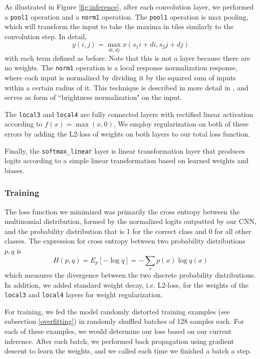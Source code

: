 \documentclass[11pt, twocolumn, twoside]{article}
\begin{document}
As illustrated in Figure \ref{fig:inference}, after each convolution layer, we performed a \texttt{pool1} operation and a \texttt{norm1} operation. The \texttt{pool1} operation is max pooling, which will transform the input to take the maxima in tiles similarly to the convolution step. In detail,
\[ y(i, j) = \max_{di, dj} x(s_1i + di, s_2j + dj)\]
with each term defined as before. Note that this is not a layer because there are no weights. The \texttt{norm1} operation is a local response normalization response, where each input is normalized by dividing it by the squared sum of inputs within a certain radius of it. This technique is described in more detail in \cite{Krizhevsky}, and serves as form of ``brightness normalization" on the input.

The \texttt{local3} and \texttt{local4} are fully connected layers with rectified linear activation according to $f(x) = \max(x, 0)$. We employ regularization on both of these errors by adding the L2-loss of weights on both layers to our total loss function. 

Finally, the \texttt{softmax\_linear} layer is linear transformation layer that produces logits according to a simple linear transformation based on learned weights and biases.

\subsubsection{Training}

The loss function we minimized was primarily the cross entropy between the multinomial distribution, formed by the normalized logits outputted by our CNN, and the probability distribution that is 1 for the correct class and 0 for all other classes. The expression for cross entropy between two probability distributions $p, q$ is
\[H(p, q) = E_p[-\log q] = -\sum_x p(x)\log q(x)\]
which measures the divergence between the two discrete probability distributions. In addition, we added standard weight decay, i.e. L2-loss, for the weights of the \texttt{local3} and \texttt{local4} layers for weight regularization.

For training, we fed the model randomly distorted training examples (see subsection \ref{overfitting}) in randomly shuffled batches of 128 samples each. For each of these examples, we would determine our loss based on our current inference. After each batch, we performed back propagation using gradient descent to learn the weights, and we called each time we finished a batch a step. 
\end{document}
